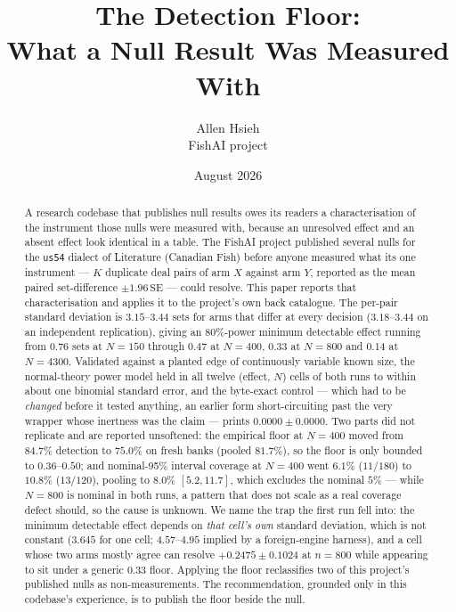 \documentclass[11pt]{article}
\title{The Detection Floor:\\ What a Null Result Was Measured With}
\author{Allen Hsieh\\[2pt] {\small FishAI project}}
\date{August 2026}
\newcommand{\code}[1]{\texttt{#1}}
\newcommand{\usff}{\code{us54}}
\begin{document}
\maketitle

\begin{abstract}
\noindent
A research codebase that publishes null results owes its readers a characterisation of the
instrument those nulls were measured with, because an unresolved effect and an absent effect look
identical in a table. The FishAI project published several nulls for the \usff{} dialect of
Literature (Canadian Fish) before anyone measured what its one instrument --- $K$ duplicate deal
pairs of arm $X$ against arm $Y$, reported as the mean paired set-difference $\pm 1.96\,\mathrm{SE}$
--- could resolve. This paper reports that characterisation and applies it to the project's own
back catalogue. The per-pair standard deviation is $3.15$--$3.44$ sets for arms that differ at every
decision ($3.18$--$3.44$ on an independent replication), giving an 80\%-power minimum detectable
effect running from $0.76$ sets at $N=150$ through $0.47$ at $N=400$, $0.33$ at $N=800$ and $0.14$ at
$N=4300$. Validated against a planted edge of continuously variable known size, the normal-theory
power model held in all twelve (effect, $N$) cells of both runs to within about one binomial standard
error, and the byte-exact control --- which had to be \emph{changed} before it tested anything, an
earlier form short-circuiting past the very wrapper whose inertness was the claim --- prints
$0.0000 \pm 0.0000$. Two parts did not replicate and are reported unsoftened: the empirical floor at
$N=400$ moved from $84.7\%$ detection to $75.0\%$ on fresh banks (pooled $81.7\%$), so the floor is
only bounded to $0.36$--$0.50$; and nominal-95\% interval coverage at $N=400$ went $6.1\%$
($11/180$) to $10.8\%$ ($13/120$), pooling to $8.0\%$ $[5.2, 11.7]$, which excludes the nominal
$5\%$ --- while $N=800$ is nominal in both runs, a pattern that does not scale as a real coverage
defect should, so the cause is unknown. We name the trap the first run fell into: the minimum
detectable effect depends on \emph{that cell's own} standard deviation, which is not constant
($3.645$ for one cell; $4.57$--$4.95$ implied by a foreign-engine harness), and a cell whose two arms
mostly agree can resolve $+0.2475 \pm 0.1024$ at $n=800$ while appearing to sit under a generic
$0.33$ floor. Applying the floor reclassifies two of this project's published nulls as
non-measurements. The recommendation, grounded only in this codebase's experience, is to publish the
floor beside the null.
\end{abstract}
\end{document}
